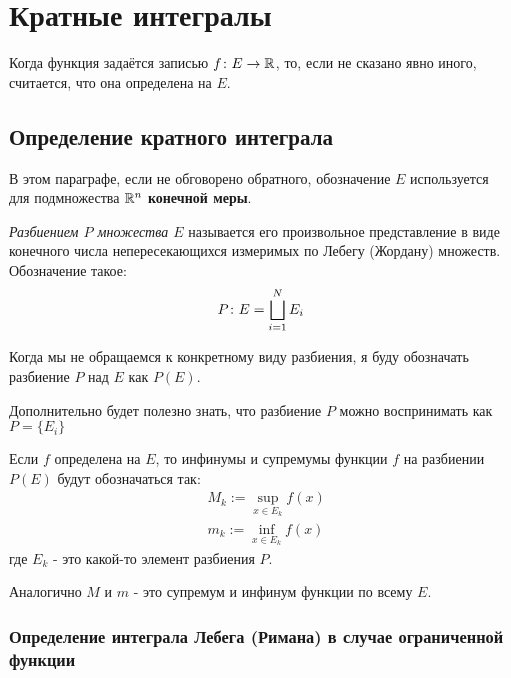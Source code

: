 \section{Кратные интегралы}

\begin{designation}
	Когда функция задаётся записью $f \colon E \to \mathbb{R}$, то, если не сказано явно иного, считается, что она определена на $E$.
\end{designation}

\subsection{Определение кратного интеграла}

\begin{designation}
	В этом параграфе, если не обговорено обратного, обозначение $E$ используется для подмножества $\mathbb{R}^n$ \textbf{конечной меры}.
\end{designation}

\begin{definition}
	\textit{Разбиением $P$ множества $E$} называется его произвольное представление в виде конечного числа непересекающихся измеримых по Лебегу (Жордану) множеств. Обозначение такое:
	\[
		P \colon E = \bigsqcup_{i = 1}^N E_i
	\]
\end{definition}

\begin{anote}
	Когда мы не обращаемся к конкретному виду разбиения, я буду обозначать разбиение $P$ над $E$ как $P(E)$.
	
	Дополнительно будет полезно знать, что разбиение $P$ можно воспринимать как $P = \{E_i\}$
\end{anote}

\begin{designation}
	Если $f$ определена на $E$, то инфинумы и супремумы функции $f$ на разбиении $P(E)$ будут обозначаться так:
	\begin{align*}
		&{M_k := \sup_{x \in E_k} f(x)}
		\\
		&{m_k := \inf_{x \in E_k} f(x)}
	\end{align*}
	где $E_k$ - это какой-то элемент разбиения $P$.
	
	Аналогично $M$ и $m$ - это супремум и инфинум функции по всему $E$.
\end{designation}

\subsubsection*{Определение интеграла Лебега (Римана) в случае ограниченной функции}

